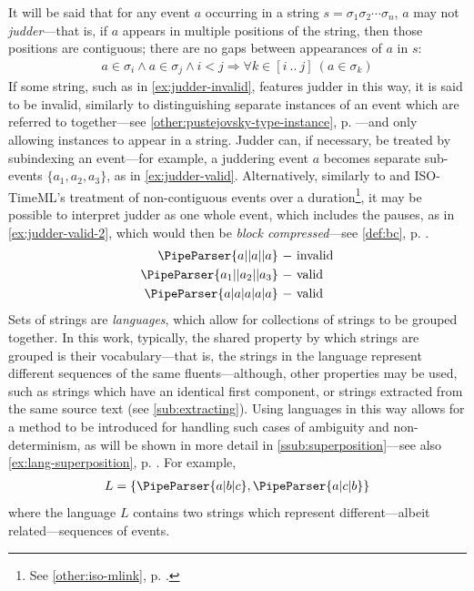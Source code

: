 \documentclass[a4paper,12pt,leqno,twoside]{article}
\newcommand{\vph}[1]{\vphantom{#1}}
\newcommand{\ebox}[1]{\fbox{$\vph{'(),}#1$}}
\newcommand{\EventString}[1]{%
	\renewcommand*{\do}[1]{\ebox{##1}}%
	\PipeParser{#1}%
}
\begin{document}
It will be said that for any event $a$ occurring in a string $s = \sigma_1\sigma_2\cdots\sigma_n$, $a$ may not \textit{judder}---that is, if $a$ appears in multiple positions of the string, then those positions are contiguous; there are no gaps between appearances of $a$ in $s$:
\begin{align}\label{impl:contiguous-events}
	a \in \sigma_i \wedge a \in \sigma_j \wedge i < j \Longrightarrow \forall k \in [i~..~j]~(a \in \sigma_k)
\end{align}
If some string, such as in \cref{ex:judder-invalid}, features judder in this way, it is said to be invalid, similarly to \citet[p. 134]{Pustejovsky2005} distinguishing separate instances of an event which are referred to together---see \cref{other:pustejovsky-type-instance}, p. \pageref{other:pustejovsky-type-instance}---and only allowing instances to appear in a string. Judder can, if necessary, be treated by subindexing an event---for example, a juddering event $a$ becomes separate sub-events $\{a_1, a_2, a_3\}$, as in \cref{ex:judder-valid}. Alternatively, similarly to \citet{bunt2010annotating} and ISO-TimeML's treatment of non-contiguous events over a duration\footnote{See \cref{other:iso-mlink}, p. \pageref{other:iso-mlink}.}, it may be possible to interpret judder as one whole event, which includes the pauses, as in \cref{ex:judder-valid-2}, which would then be \textit{block compressed}---see \cref{def:bc}, p. \pageref{def:bc}.
\begin{subequations}\label{ex:judder}
	\begin{align}
		\EventString{a|{}|a|{}|a}\label{ex:judder-invalid} ~-~& \text{invalid}\\
		\EventString{a_1|{}|a_2|{}|a_3}\label{ex:judder-valid} ~-~& \text{valid}\\
		\EventString{a|a|a|a|a}\label{ex:judder-valid-2} ~-~& \text{valid}
	\end{align}
\end{subequations}
Sets of strings are \textit{languages}, which allow for collections of strings to be grouped together. In this work, typically, the shared property by which strings are grouped is their vocabulary---that is, the strings in the language represent different sequences of the same fluents---although, other properties may be used, such as strings which have an identical first component, or strings extracted from the same source text (see \cref{sub:extracting}). Using languages in this way allows for a method to be introduced for handling such cases of ambiguity and non-determinism, as will be shown in more detail in \cref{ssub:superposition}---see also \cref{ex:lang-superposition}, p. \pageref{ex:lang-superposition}. For example,
\begin{align}
	L = \{\EventString{a|b|c}, \EventString{a|c|b}\}
\end{align}
where the language $L$ contains two strings which represent different---albeit related---sequences of events.
\end{document}
